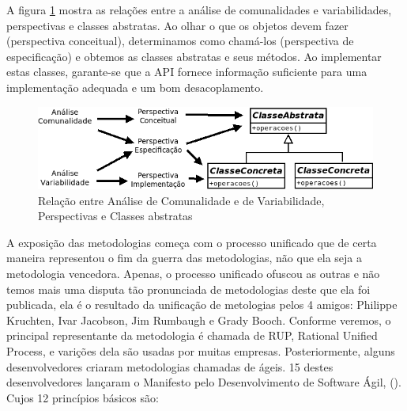 \documentclass[
	11pt,				%
	openright,
	twoside,			%
	a4paper,			%
	english,			%
	french,
	brazil,				%
	sumario=tradicional
	]{abntex2}
\begin{document}
A figura \ref{fig:cvaPersp} mostra as relações entre a análise de comunalidades e variabilidades, perspectivas e classes abstratas. Ao olhar o que os objetos devem fazer (perspectiva conceitual), determinamos como chamá-los (perspectiva de especificação) e obtemos as classes abstratas e seus métodos. Ao implementar estas classes, garante-se que a API fornece informação suficiente para uma implementação adequada e um bom desacoplamento.

\begin{figure}[h]
\begin{center}
\includegraphics[scale=0.4]{cva_persp.png}
\caption{Relação entre Análise de Comunalidade e de Variabilidade, Perspectivas e Classes abstratas} \label{fig:cvaPersp}
\end{center}
\end{figure}

A exposição das metodologias começa com o processo unificado que de certa maneira representou o fim da guerra das metodologias, não que ela seja a metodologia vencedora. Apenas, o processo unificado ofuscou as outras e não temos mais uma disputa tão pronunciada de metodologias deste que ela foi publicada, ela é o resultado da unificação de metologias pelos 4 amigos: Philippe Kruchten,  Ivar Jacobson, Jim Rumbaugh e Grady Booch. Conforme veremos, o principal representante da metodologia é chamada de RUP, Rational Unified Process, e varições dela são usadas por muitas empresas. Posteriormente, alguns desenvolvedores criaram metodologias chamadas de ágeis. 15 destes desenvolvedores lançaram o Manifesto pelo Desenvolvimento de Software Ágil, (). Cujos 12 princípios básicos são:
\end{document}
